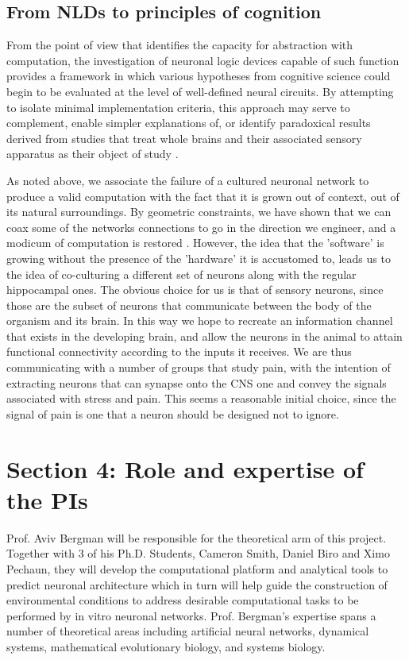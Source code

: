 \subsection{From NLDs to principles of cognition}

From the point of view that identifies the capacity for abstraction with
computation, the investigation of neuronal logic devices capable of such
function provides a framework in which various hypotheses from cognitive
science could begin to be evaluated at the level of well-defined neural
circuits. By attempting to isolate minimal implementation criteria, this
approach may serve to complement, enable simpler explanations of, or
identify paradoxical results derived from studies that treat whole
brains and their associated sensory apparatus as their object of study
\cite{McClelland2010,Griffiths2010}. 

As noted above, we associate the failure of a cultured neuronal network to produce a valid computation with the fact that it is grown out of context, out of its natural surroundings. By geometric constraints, we have shown that we can coax some of the networks connections to go in the direction we engineer, and a modicum of computation is restored \cite{Feinerman2008}. However, the idea that the 'software' is growing without the presence of the 'hardware' it is accustomed to, leads us to the idea of co-culturing a different set of neurons along with the regular hippocampal ones. The obvious choice for us is that of sensory neurons, since those are the subset of neurons that communicate between the body of the organism and its brain. In this way we hope to recreate an information channel that exists in the developing brain, and allow the neurons in the animal to attain functional connectivity according to the inputs it receives. 
We are thus communicating with a number of groups that study pain, with the intention of extracting neurons that can synapse onto the CNS one and convey the signals associated with stress and pain. This seems a reasonable initial choice, since the signal of pain is one that a neuron should be designed not to ignore.

\section{Section 4: Role and expertise of the PIs}

Prof. Aviv Bergman will be responsible for the theoretical arm of this project. Together with 3 of his Ph.D. Students, Cameron Smith, Daniel Biro and Ximo Pechaun, they will develop the computational platform and analytical tools to predict neuronal architecture which in turn will help guide the construction of environmental conditions to address desirable computational tasks to be performed by in vitro neuronal networks. Prof. Bergman's expertise spans a number of theoretical areas including artificial neural networks, dynamical systems, mathematical evolutionary biology, and systems biology.


